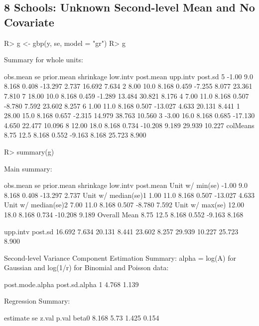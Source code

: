 \documentclass[article]{jss}
\begin{document}
\subsection[Unknown Second-level Mean and No Covariate]{8 Schools: Unknown Second-level Mean and No Covariate}
\begin{CodeChunk}
\begin{CodeInput}
R> g <- gbp(y, se, model = "gr")
R> g
\end{CodeInput}
\begin{CodeOutput}
Summary for whole units: 

         obs.mean   se prior.mean shrinkage low.intv post.mean upp.intv post.sd
5           -1.00  9.0      8.168     0.408  -13.297     2.737   16.692   7.634
2            8.00 10.0      8.168     0.459   -7.255     8.077   23.361   7.810
7           18.00 10.0      8.168     0.459   -1.289    13.484   30.821   8.176
4            7.00 11.0      8.168     0.507   -8.780     7.592   23.602   8.257
6            1.00 11.0      8.168     0.507  -13.027     4.633   20.131   8.441
1           28.00 15.0      8.168     0.657   -2.315    14.979   38.763  10.560
3           -3.00 16.0      8.168     0.685  -17.130     4.650   22.477  10.096
8           12.00 18.0      8.168     0.734  -10.208     9.189   29.939  10.227
colMeans     8.75 12.5      8.168     0.552   -9.163     8.168   25.723   8.900
\end{CodeOutput}
\end{CodeChunk}

\begin{CodeChunk}
\begin{CodeInput}
R> summary(g)
\end{CodeInput}
\begin{CodeOutput}
Main summary:

                    obs.mean   se prior.mean shrinkage low.intv post.mean
Unit w/ min(se)        -1.00  9.0      8.168     0.408  -13.297     2.737
Unit w/ median(se)1     1.00 11.0      8.168     0.507  -13.027     4.633
Unit w/ median(se)2     7.00 11.0      8.168     0.507   -8.780     7.592
Unit w/ max(se)        12.00 18.0      8.168     0.734  -10.208     9.189
Overall Mean            8.75 12.5      8.168     0.552   -9.163     8.168

                     upp.intv post.sd
                       16.692   7.634
                       20.131   8.441
                       23.602   8.257
                       29.939  10.227
                       25.723   8.900

Second-level Variance Component Estimation Summary:
alpha = log(A) for Gaussian and log(1/r) for Binomial and Poisson data:

  post.mode.alpha post.sd.alpha
1           4.768         1.139


Regression Summary:

      estimate   se z.val p.val
beta0    8.168 5.73 1.425 0.154
\end{CodeOutput}
\end{CodeChunk}
\end{document}
